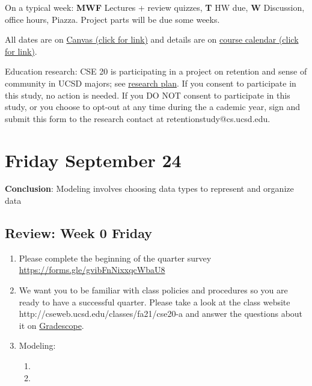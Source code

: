On a typical week: {\bf MWF} Lectures + review quizzes, {\bf T} HW due, {\bf W} Discussion, office hours, Piazza. 
Project parts will be due some weeks.

All dates are on \href{https://canvas.ucsd.edu/}{Canvas (click for link)} and details are on
 \href{https://discrete-math-for-cs.github.io/website/overview_calendar.html}{course calendar (click for link)}.

Education research: CSE 20 is participating in a project on retention and sense of community 
in UCSD majors; see \href{https://discrete-math-for-cs.github.io/files/CSInclusiveMentoringConsentFormNonCSEDataAnalysis.pdf}{research plan}. If you consent to participate in this study, no action is needed. 
If you DO NOT consent to participate in this study, or you choose to opt-out at any time during the a
cademic year, sign and submit this form to the research contact at retentionstudy@cs.ucsd.edu.


\newpage
\section*{Friday September 24}



{\bf Conclusion}: Modeling involves choosing data types to represent and organize data

\newpage
\subsection*{Review: Week 0 Friday}
\begin{enumerate}
\item Please complete the beginning of the quarter survey \href{https://forms.gle/gvibFnNixxqcWbaU8}{https://forms.gle/gvibFnNixxqcWbaU8}
\item We want you to be familiar with class policies and procedures so you are ready to have a successful quarter. 
Please take a look at the class website http://cseweb.ucsd.edu/classes/fa21/cse20-a
and answer the questions about it on \href{http://gradescope.com}{Gradescope}.
\item Modeling: 
\begin{enumerate}
    \item {}
    \item {}
\end{enumerate}
\end{enumerate}
\newpage
